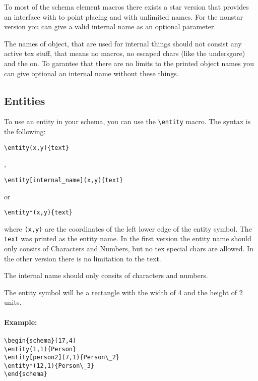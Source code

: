 \documentclass[a4paper,11pt]{article}
\begin{document}
To most of the schema element macros there exists a star version that
provides an interface with to point placing and with unlimited names.
For the nonstar version you can give a valid internal name as an optional 
parameter.

The names of object, that are used for internal things should not consist any
active tex stuff, that means no macros, no escaped chars (like the undersgore)
and the on. To garantee that there are no limits to the printed object names 
you can give optional an internal name without these things.

\subsection{Entities}

To use an entity in your schema, you can use the \verb|\entity| macro.
The syntax is the following:

\begin{verbatim}
\entity(x,y){text}
\end{verbatim}

,

\begin{verbatim}
\entity[internal_name](x,y){text}
\end{verbatim}

or 

\begin{verbatim}
\entity*(x,y){text}
\end{verbatim}

where {\tt (x,y)} are the coordinates of the left lower edge of the entity
symbol. The {\tt text} was printed as the entity name. In the first version 
the entity name should only consits of Characters and Numbers, 
but no tex special chars are allowed.
In the other version there is no limitation to the text.

The internal name should only consits of characters and numbers.

The entity symbol will be a rectangle with the width of 4 and the height of 2 
units.

\paragraph{Example:}
\begin{verbatim}
\begin{schema}(17,4)
\entity(1,1){Person}
\entity[person2](7,1){Person\_2}
\entity*(12,1){Person\_3}
\end{schema}
\end{verbatim}
\end{document}
